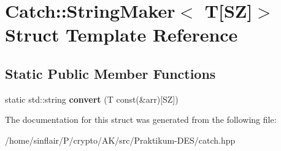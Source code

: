 \hypertarget{structCatch_1_1StringMaker_3_01T[SZ]_4}{}\section{Catch\+:\+:String\+Maker$<$ T\mbox{[}SZ\mbox{]}$>$ Struct Template Reference}
\label{structCatch_1_1StringMaker_3_01T[SZ]_4}
\subsection*{Static Public Member Functions}
\begin{DoxyCompactItemize}
\item 
\mbox{\label{structCatch_1_1StringMaker_3_01T[SZ]_4_a3698cea2c24d8649ec9ecb5fa679eeb7}} 
static std\+::string {\bfseries convert} (T const(\&arr)\mbox{[}SZ\mbox{]})
\end{DoxyCompactItemize}


The documentation for this struct was generated from the following file\+:\begin{DoxyCompactItemize}
\item 
/home/sinflair/\+P/crypto/\+A\+K/src/\+Praktikum-\/\+D\+E\+S/catch.\+hpp\end{DoxyCompactItemize}
